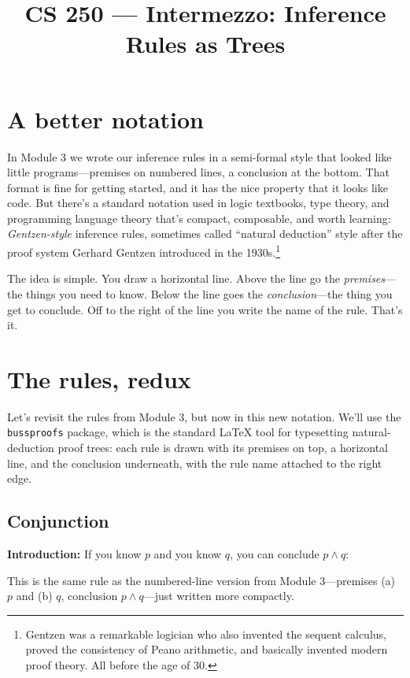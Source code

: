 \documentclass[11pt]{article}
\title{CS 250 --- Intermezzo: Inference Rules as Trees}
\author{}
\date{}
\begin{document}
\maketitle

\section{A better notation}

In Module 3 we wrote our inference rules in a semi-formal style that looked like little programs---premises on numbered lines, a conclusion at the bottom. That format is fine for getting started, and it has the nice property that it looks like code. But there's a standard notation used in logic textbooks, type theory, and programming language theory that's compact, composable, and worth learning: \emph{Gentzen-style} inference rules, sometimes called ``natural deduction'' style after the proof system Gerhard Gentzen introduced in the 1930s.\footnote{Gentzen was a remarkable logician who also invented the sequent calculus, proved the consistency of Peano arithmetic, and basically invented modern proof theory. All before the age of 30.}

The idea is simple. You draw a horizontal line. Above the line go the \emph{premises}---the things you need to know. Below the line goes the \emph{conclusion}---the thing you get to conclude. Off to the right of the line you write the name of the rule. That's it.

\section{The rules, redux}

Let's revisit the rules from Module 3, but now in this new notation. We'll use the \texttt{bussproofs} package, which is the standard \LaTeX{} tool for typesetting natural-deduction proof trees: each rule is drawn with its premises on top, a horizontal line, and the conclusion underneath, with the rule name attached to the right edge.

\subsection{Conjunction}

\noindent\textbf{Introduction:}
If you know $p$ and you know $q$, you can conclude $p \wedge q$:
\begin{center}
\begin{prooftree}
\end{prooftree}
\end{center}
This is the same rule as the numbered-line version from Module 3---premises (a) $p$ and (b) $q$, conclusion $p \wedge q$---just written more compactly.
\end{document}
